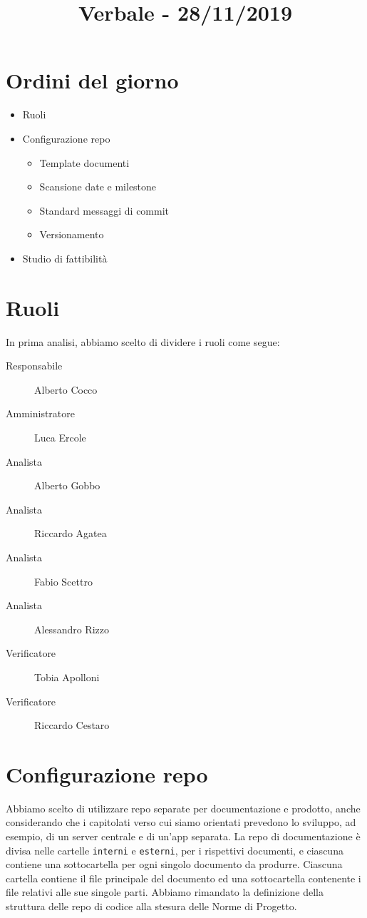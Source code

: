 \documentclass{article}
\title{Verbale - 28/11/2019}
\newcommand{\commons}{../../commons}
\begin{document}
	
	\section{Ordini del giorno}
	\label{sec:ordini_del_giorno}
	\begin{itemize}
		\item Ruoli
		\item Configurazione repo
		\begin{itemize}
			\item Template documenti
			\item Scansione date e milestone
			\item Standard messaggi di commit
			\item Versionamento
		\end{itemize}
		\item Studio di fattibilità
	\end{itemize}
	\section{Ruoli}
	\label{sec:ruoli}
	In prima analisi, abbiamo scelto di dividere i ruoli come segue:
	\begin{description}
		\item[Responsabile] Alberto Cocco
		\item[Amministratore] Luca Ercole
		\item[Analista] Alberto Gobbo
		\item[Analista] Riccardo Agatea
		\item[Analista] Fabio Scettro
		\item[Analista] Alessandro Rizzo
		\item[Verificatore] Tobia Apolloni
		\item[Verificatore] Riccardo Cestaro
	\end{description}
	\section{Configurazione repo}
	\label{sec:configurazione_repo}
	Abbiamo scelto di utilizzare repo separate per documentazione e prodotto, anche considerando che i capitolati verso cui siamo orientati prevedono lo sviluppo, ad esempio, di un server centrale e di un'app separata. La repo di documentazione è divisa nelle cartelle \verb|interni| e \verb|esterni|, per i rispettivi documenti, e ciascuna contiene una sottocartella per ogni singolo documento da produrre. Ciascuna cartella contiene il file principale del documento ed una sottocartella contenente i file relativi alle sue singole parti. Abbiamo rimandato la definizione della struttura delle repo di codice alla stesura delle Norme di Progetto.
\end{document}
